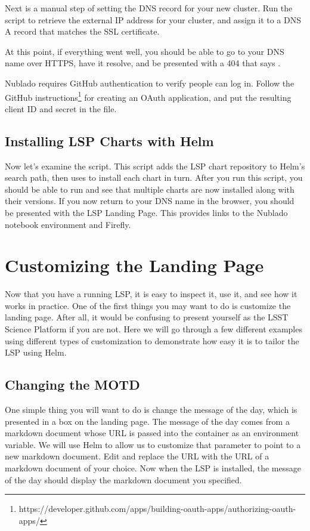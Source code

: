 \documentclass[11pt,twoside]{article}
\begin{document}
Next is a manual step of setting the DNS record for your new cluster.
Run the  script to retrieve the external IP address for your
cluster, and assign it to a DNS A record that matches the SSL certificate.

At this point, if everything went well, you should be able to go to your
DNS name over HTTPS, have it resolve, and be presented with a 404 that says
.

Nublado requires GitHub authentication to verify people can log in.  Follow
the GitHub instructions\footnote{
https://developer.github.com/apps/building-oauth-apps/authorizing-oauth-apps/
} for creating an OAuth application, and put the resulting client ID and secret in the
 file.

\subsection{Installing LSP Charts with Helm}

Now let's examine the  script.  This script adds the LSP
chart repository to Helm's search path, then uses  to install
each chart in turn.  After you run this script, you should be able to run 
and see that multiple charts are now installed along with their versions.  If you
now return to your DNS name in the browser, you should be presented with the
LSP Landing Page.  This provides links to the Nublado notebook environment and
Firefly.

\section{Customizing the Landing Page}

Now that you have a running LSP, it is easy to inspect it, use it, and see
how it works in practice.  One of the first things you may want to do is
customize the landing page.  After all, it would be confusing to present
yourself as the LSST Science Platform if you are not.  Here we will go
through a few different examples using different types of customization
to demonstrate how easy it is to tailor the LSP using Helm.

\subsection{Changing the MOTD}

One simple thing you will want to do is change the message of the day,
which is presented in a box on the landing page. The message of the day
comes from a markdown document whose URL is passed into the container
as an environment variable.  We will use Helm to allow us to customize that parameter
to point to a new markdown document.  Edit 
and replace the  URL with the URL of a markdown document
of your choice. Now when the LSP is installed, the message of the day should display
the markdown document you specified.
\end{document}
